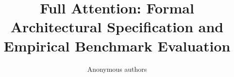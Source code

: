 \title{\textbf{Full Attention: Formal Architectural Specification and Empirical Benchmark Evaluation}}

\author{Anonymous authors}
